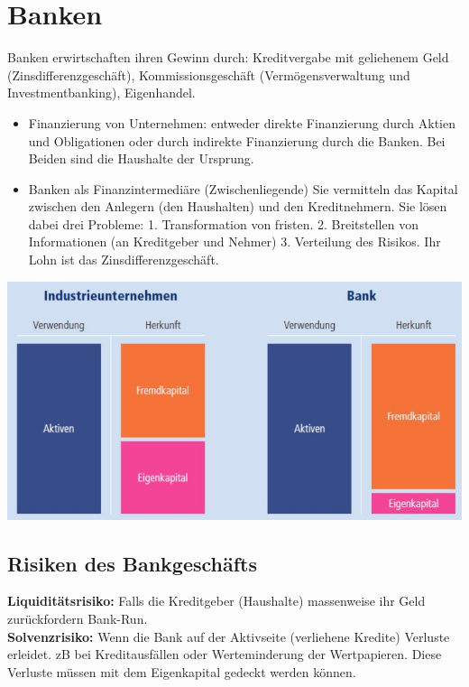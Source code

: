 \section{Banken}
Banken erwirtschaften ihren Gewinn durch: Kreditvergabe mit geliehenem Geld (Zinsdifferenzgeschäft), Kommissionsgeschäft (Vermögensverwaltung und Investmentbanking), Eigenhandel.
\begin{itemize}
	\item Finanzierung von Unternehmen: entweder direkte Finanzierung durch Aktien und Obligationen oder durch indirekte Finanzierung durch die Banken. Bei Beiden sind die Haushalte der Ursprung.
	\item Banken als Finanzintermediäre (Zwischenliegende)
	Sie vermitteln das Kapital zwischen den Anlegern (den Haushalten) und den Kreditnehmern. Sie lösen dabei drei Probleme: 1. Transformation von fristen. 2. Breitstellen von Informationen (an Kreditgeber und Nehmer) 3. Verteilung des Risikos. Ihr Lohn ist das Zinsdifferenzgeschäft.  
\end{itemize}
\includegraphics[width=0.8\linewidth]{images/banken.jpg}
\subsection{Risiken des Bankgeschäfts}
\textbf{Liquiditätsrisiko:} Falls die Kreditgeber (Haushalte) massenweise ihr Geld zurückfordern Bank-Run.\\
\textbf{Solvenzrisiko:} Wenn die Bank auf der Aktivseite (verliehene Kredite) Verluste erleidet. zB bei Kreditausfällen oder Werteminderung der Wertpapieren. Diese Verluste müssen mit dem Eigenkapital gedeckt werden können. 

